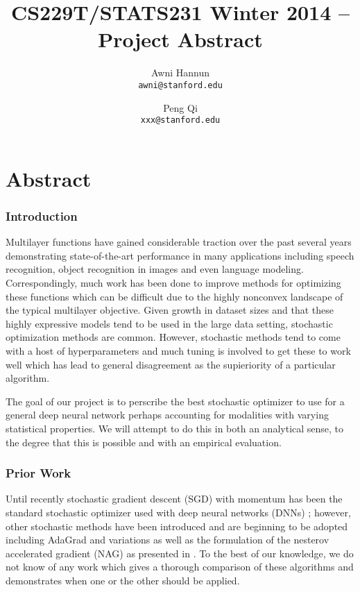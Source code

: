 \documentclass[12pt,english]{article}
\title{
CS229T/STATS231 Winter 2014 -- Project Abstract
}
\author{
Awni Hannun \\
\texttt{awni@stanford.edu}
\and
Peng Qi \\
\texttt{xxx@stanford.edu}
}
\newcommand{\1}{\mathbb{I}} %
\begin{document}
\maketitle

\section*{Abstract}

\subsubsection*{Introduction}

Multilayer functions have gained considerable traction over the past several
years demonstrating state-of-the-art performance in many applications including
speech recognition, object recognition in images and even language modeling.
Correspondingly, much work has been done to improve methods for optimizing
these functions which can be difficult due to the highly nonconvex landscape of
the typical multilayer objective. Given growth in dataset sizes and that these
highly expressive models tend to be used in the large data setting, stochastic
optimization methods are common. However, stochastic methods tend to come with
a host of hyperparameters and much tuning is involved to get these to work well
which has lead to general disagreement as the supieriority of a particular
algorithm. 

The goal of our project is to perscribe the best stochastic optimizer to use
for a general deep neural network perhaps accounting for modalities with
varying statistical properties. We will attempt to do this in both an
analytical sense, to the degree that this is possible and with an empirical
evaluation. 

\subsubsection*{Prior Work}\label{prior_work}

Until recently stochastic gradient descent (SGD) with momentum has been the
standard stochastic optimizer used with deep neural networks (DNNs)
\cite{hinton_guide_tr}; however, other stochastic methods have been introduced
and are beginning to be adopted including AdaGrad \cite{duchi_adagrad} and
variations as well as the formulation of the nesterov accelerated gradient
(NAG) as presented in \cite{sutskever_nag}. To the best of our knowledge, we do
not know of any work which gives a thorough comparison of these algorithms and
demonstrates when one or the other should be applied.  
\end{document}
